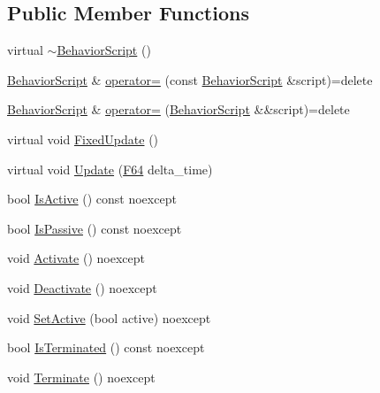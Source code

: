 \subsection*{Public Member Functions}
\begin{DoxyCompactItemize}
\item 
virtual \hyperlink{classmage_1_1_behavior_script_a61e4825ba0fc7746d49faa44ed7bc481}{$\sim$\+Behavior\+Script} ()
\item 
\hyperlink{classmage_1_1_behavior_script}{Behavior\+Script} \& \hyperlink{classmage_1_1_behavior_script_a0b3327ebf7009e668a7022d254cb1d51}{operator=} (const \hyperlink{classmage_1_1_behavior_script}{Behavior\+Script} \&script)=delete
\item 
\hyperlink{classmage_1_1_behavior_script}{Behavior\+Script} \& \hyperlink{classmage_1_1_behavior_script_a528c2bd218f2e6bb7d0a8ee50a05bf01}{operator=} (\hyperlink{classmage_1_1_behavior_script}{Behavior\+Script} \&\&script)=delete
\item 
virtual void \hyperlink{classmage_1_1_behavior_script_a8318f79ab78798ec37b39bc844f7138c}{Fixed\+Update} ()
\item 
virtual void \hyperlink{classmage_1_1_behavior_script_a58c0fb3e1f2f3fb3a41e658a99b84a21}{Update} (\hyperlink{namespacemage_ad26233bbec640deda836e572c1a23708}{F64} delta\+\_\+time)
\item 
bool \hyperlink{classmage_1_1_behavior_script_a856e1b420ea0ead36adafa750237325c}{Is\+Active} () const noexcept
\item 
bool \hyperlink{classmage_1_1_behavior_script_a40e33539ca7013a13ef127af11bff3e1}{Is\+Passive} () const noexcept
\item 
void \hyperlink{classmage_1_1_behavior_script_a84a5bf0fc7ec3ecd36dddaf001143b54}{Activate} () noexcept
\item 
void \hyperlink{classmage_1_1_behavior_script_ab45260db9c30d596b1d688a01458f63e}{Deactivate} () noexcept
\item 
void \hyperlink{classmage_1_1_behavior_script_ab0dc76b101fd514c6e9f8799de382e8a}{Set\+Active} (bool active) noexcept
\item 
bool \hyperlink{classmage_1_1_behavior_script_abb1625dbaa3b1145009ea474b082938f}{Is\+Terminated} () const noexcept
\item 
void \hyperlink{classmage_1_1_behavior_script_a2beae460bb84a135aa7e29c7baf6b25b}{Terminate} () noexcept
\end{DoxyCompactItemize}
